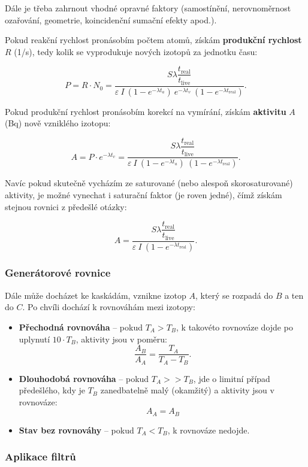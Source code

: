Dále je třeba zahrnout vhodné opravné faktory (samostínění, nerovnoměrnost ozařování, geometrie, koincidenční sumační efekty apod.).

Pokud reakční rychlost pronásobím počtem atomů, získám \textbf{produkční rychlost} $R$ (1/s), tedy kolik se vyprodukuje nových izotopů za jednotku času:

$$ \boxed{ P = R \cdot N_0 = \dfrac{S \lambda \dfrac{t_\text{real}}{t_\text{live}}}{\varepsilon \: I \: (1-e^{-\lambda t_a}) \: e^{-\lambda t_v} \: (1-e^{-\lambda t_\text{real}})}.} $$

Pokud produkční rychlost pronásobím korekcí na vymírání, získám \textbf{aktivitu} $A$ (Bq) nově vzniklého izotopu:

$$ \boxed{ A = P \cdot e^{-\lambda t_v} = \dfrac{S \lambda \dfrac{t_\text{real}}{t_\text{live}}}{\varepsilon \: I \: (1-e^{-\lambda t_a}) \: (1-e^{-\lambda t_\text{real}})}.} $$

Navíc pokud skutečně vycházím ze saturované (nebo alespoň skorosaturované) aktivity, je možné vynechat i saturační faktor (je roven jedné), čímž získám stejnou rovnici z předešlé otázky:

$$ \boxed{ A = \dfrac{S \lambda \dfrac{t_\text{real}}{t_\text{live}}}{\varepsilon \: I \: (1-e^{-\lambda t_\text{real}})}.} $$

\subsubsection{Generátorové rovnice}

Dále může docházet ke kaskádám, vznikne izotop $A$, který se rozpadá do $B$ a ten do $C$. Po chvíli dochází k rovnováhám mezi izotopy:

\begin{itemize}
    \item \textbf{Přechodná rovnováha} -- pokud $T_A > T_B$, k takovéto rovnováze dojde po uplynutí $10 \cdot T_B$, aktivity jsou v poměru:
    $$ \dfrac{A_B}{A_A} = \dfrac{T_A}{T_A - T_B}. $$
    \item \textbf{Dlouhodobá rovnováha} -- pokud $T_A >> T_B$, jde o limitní případ předešlého, kdy je $T_B$ zanedbatelně malý (okamžitý) a aktivity jsou v rovnováze:
    $$ A_A = A_B $$
    \item \textbf{Stav bez rovnováhy} -- pokud $T_A < T_B $, k rovnováze nedojde.
\end{itemize}

\subsubsection{Aplikace filtrů}

